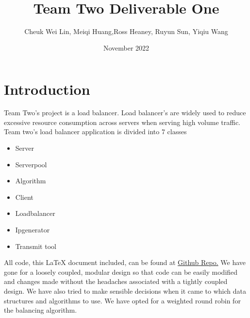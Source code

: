 \documentclass{article}
\title{Team Two Deliverable One}
\author{Cheuk Wei Lin, Meiqi Huang,Ross Heaney, Ruyun Sun, Yiqiu Wang}
\date{November 2022}
\begin{document}
\maketitle

\section{Introduction}
Team Two's project is a load balancer. Load balancer's are widely used to reduce excessive resource consumption across servers when serving high volume traffic. Team two's load balancer application is divided into 7 classes
\begin{itemize}
    \item Server
    \item Serverpool
    \item Algorithm
    \item Client
    \item Loadbalancer
    \item Ipgenerator
    \item Transmit tool
\end{itemize}

All code, this LaTeX document included, can be found at \href{https://github.com/ross39/CS6422-LoadBalancer}{Github Repo.} 
We have gone for a loosely coupled, modular design so that code can be easily modified and changes made without the headaches associated with a tightly coupled design. We have also tried to make sensible decisions when it came to which data structures and algorithms to use. We have opted for a weighted round robin for the balancing algorithm. 
\end{document}
